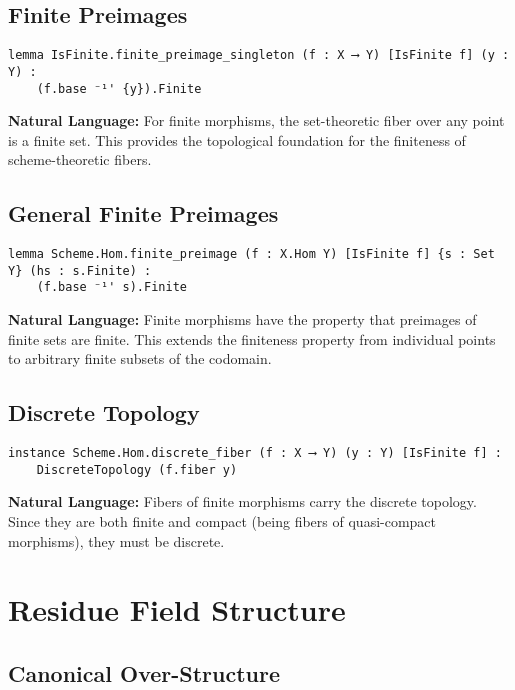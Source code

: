 \documentclass{article}
\theoremstyle{definition}
\begin{document}
\subsection{Finite Preimages}

\begin{lstlisting}
lemma IsFinite.finite_preimage_singleton (f : X ⟶ Y) [IsFinite f] (y : Y) :
    (f.base ⁻¹' {y}).Finite
\end{lstlisting}

\textbf{Natural Language:} For finite morphisms, the set-theoretic fiber over any point is a finite set. This provides the topological foundation for the finiteness of scheme-theoretic fibers.

\subsection{General Finite Preimages}

\begin{lstlisting}
lemma Scheme.Hom.finite_preimage (f : X.Hom Y) [IsFinite f] {s : Set Y} (hs : s.Finite) :
    (f.base ⁻¹' s).Finite
\end{lstlisting}

\textbf{Natural Language:} Finite morphisms have the property that preimages of finite sets are finite. This extends the finiteness property from individual points to arbitrary finite subsets of the codomain.

\subsection{Discrete Topology}

\begin{lstlisting}
instance Scheme.Hom.discrete_fiber (f : X ⟶ Y) (y : Y) [IsFinite f] :
    DiscreteTopology (f.fiber y)
\end{lstlisting}

\textbf{Natural Language:} Fibers of finite morphisms carry the discrete topology. Since they are both finite and compact (being fibers of quasi-compact morphisms), they must be discrete.

\section{Residue Field Structure}

\subsection{Canonical Over-Structure}
\end{document}
